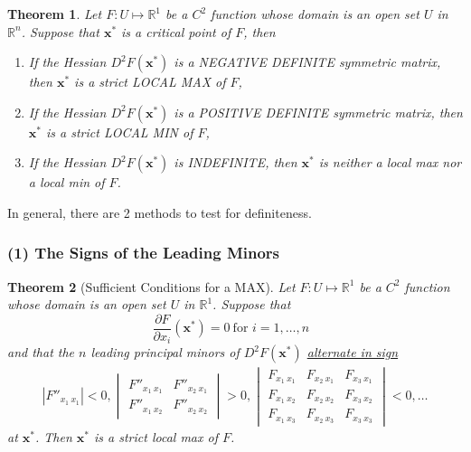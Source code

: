 \documentclass[11pt,a4paper]{book}
\newtheorem{theorem}{Theorem}[section]
\theoremstyle{definition}\newtheorem{definition}{Definition}
\theoremstyle{definition}\newtheorem{fact}{Fact}
\theoremstyle{definition}\newtheorem{remark}{Remark}
\theoremstyle{definition}\newtheorem{ex}{Ex.}
\theoremstyle{definition}\newtheorem{project}{Project}
\theoremstyle{definition}\newtheorem{problem}{Problem}
\theoremstyle{definition}\newtheorem{example}{Example}
\newenvironment{ftheorem}
{\begin{mdframed}\begin{theorem}}
		{\end{theorem}\end{mdframed}}
\numberwithin{theorem}{section}
\numberwithin{corollary}{chapter}
\numberwithin{assumption}{chapter}
\numberwithin{definition}{chapter}
\numberwithin{prop}{chapter}
\numberwithin{notation}{chapter}
\numberwithin{problem}{chapter}
\numberwithin{example}{chapter}
\numberwithin{fact}{chapter}
\numberwithin{ex}{chapter}
\def\R{\mathbb R}
\def\R{\mathbb R}
\def\x{\mathbf x}
\begin{document}
	\begin{ftheorem}
		Let $F: U \mapsto \R^1$ be a $C^2$ function whose domain is an open set $U$ in $\R^n$. Suppose that $\x^*$ is a critical point of $F$, then
		\begin{enumerate}
			\item If the Hessian $D^2 F(\x^*)$ is a NEGATIVE DEFINITE symmetric matrix, then $\x^*$ is a strict LOCAL MAX of $F$,
			\item If the Hessian $D^2 F(\x^*)$ is a POSITIVE DEFINITE symmetric matrix, then $\x^*$ is a strict LOCAL MIN of $F$,
			\item If the Hessian $D^2 F(\x^*)$ is INDEFINITE, then $\x^*$ is neither a local max nor a local min of $F$.
		\end{enumerate}
	\end{ftheorem}
	
	In general, there are 2 methods to test for definiteness.
	
	\subsubsection{(1) The Signs of the Leading Minors}
	\begin{ftheorem}[Sufficient Conditions for a MAX]
		Let $F: U \mapsto \R^1$ be a $C^2$ function whose domain is an open set $U$ in $\R^1$. Suppose that
		\begin{equation*}
			\frac{\partial F}{\partial x_i} (\x^*) = 0 \ \text{for $i = 1, \dots, n$ }
		\end{equation*}
		and that the $n$ leading principal minors of $D^2 F(\x^*)$ \underline{alternate in sign}
		\begin{align*}
			|F''_{x_1 \ x_1}| < 0, 
			\begin{vmatrix}
				F''_{x_1 \ x_1} & F''_{x_2 \ x_1} \\
				F''_{x_1 \ x_2} & F''_{x_2 \ x_2} 
			\end{vmatrix} > 0,
			\begin{vmatrix}
				F_{x_1 \ x_1} & F_{x_2 \ x_1} & F_{x_3 \ x_1} \\
				F_{x_1 \ x_2} & F_{x_2 \ x_2} & F_{x_3 \ x_2} \\
				F_{x_1 \ x_3} & F_{x_2 \ x_3} & F_{x_3 \ x_3} 
			\end{vmatrix} < 0, \dots
		\end{align*}
		at $\x^*$. Then $\x^*$ is a strict local max of $F$.
	\end{ftheorem}
	
\end{document}
